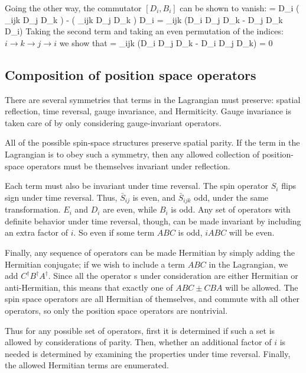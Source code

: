 Going the other way, the commutator $[D_i, B_i]$ can be shown to vanish:
\beq
	[D_i, B_i] = D_i ( \epsilon_{ijk} D_j D_k ) - ( \epsilon_{ijk} D_j D_k ) D_i
			= \epsilon_{ijk} (D_i D_j D_k - D_j D_k D_i)
\eeq
Taking the second term and taking an even permutation of the indices: $i \to k \to j \to i$ we show that
\beq
	[D_i, B_i] = \epsilon_{ijk} (D_i D_j D_k - D_i D_j D_k) = 0
\eeq




\subsection{Composition of position space operators}

There are several symmetries that terms in the Lagrangian must preserve: spatial reflection, time reversal, gauge invariance, and Hermiticity.  Gauge invariance is taken care of by only considering gauge-invariant operators.

All of the possible spin-space structures preserve spatial parity.  If the term in the Lagrangian is to obey such a symmetry, then any allowed collection of position-space operators must be themselves invariant under reflection.  

Each term must also be invariant under time reversal.  The spin operator $S_i$ flips sign under time reversal.  Thus, $\bar{S}_{ij}$ is even, and $\bar{S}_{ijk}$ odd, under the same transformation.  $E_i$ and $D_i$ are even, while $B_i$ is odd.  Any set of operators with definite behavior under time reversal, though, can be made invariant by including an extra factor of $i$.  So even if some term $ABC$ is odd, $iABC$ will be even.

Finally, any sequence of operators can be made Hermitian by simply adding the Hermitian conjugate; if we wish to include a term $ABC$ in the Lagrangian, we add $C^\dagger B^\dagger A^\dagger$.  Since all the operator	s under consideration are either Hermitian or anti-Hermitian, this means that exactly one of $ABC \pm CBA$ will be allowed.  The spin space operators are all Hermitian of themselves, and commute with all other operators, so only the position space operators are nontrivial.

Thus for any possible set of operators, first it is determined if such a set is allowed by considerations of parity.  Then, whether an additional factor of $i$ is needed is determined by examining the properties under time reversal.  Finally, the allowed Hermitian terms are enumerated.

